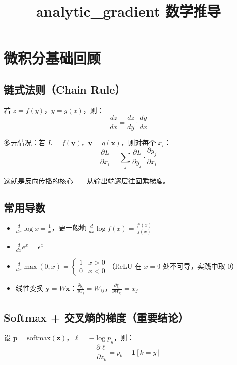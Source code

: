 \documentclass[12pt,a4paper]{article}
\title{analytic\_gradient 数学推导}
\author{}
\date{}
\begin{document}
\maketitle

\section{微积分基础回顾}

\subsection{链式法则（Chain Rule）}

若 $z = f(y)$，$y = g(x)$，则：
\[
\frac{dz}{dx} = \frac{dz}{dy} \cdot \frac{dy}{dx}
\]

多元情况：若 $L = f(\mathbf{y})$，$\mathbf{y} = g(\mathbf{x})$，则对每个 $x_i$：
\[
\frac{\partial L}{\partial x_i} = \sum_j \frac{\partial L}{\partial y_j} \cdot \frac{\partial y_j}{\partial x_i}
\]

这就是反向传播的核心——从输出端逐层往回乘梯度。

\subsection{常用导数}

\begin{itemize}
    \item $\displaystyle \frac{d}{dx} \log x = \frac{1}{x}$，更一般地 $\displaystyle \frac{d}{dx} \log f(x) = \frac{f'(x)}{f(x)}$
    \item $\displaystyle \frac{d}{dx} e^x = e^x$
    \item $\displaystyle \frac{d}{dx} \max(0, x) = \begin{cases} 1 & x > 0 \\ 0 & x < 0 \end{cases}$（ReLU 在 $x=0$ 处不可导，实践中取 0）
    \item 线性变换 $\mathbf{y} = W\mathbf{x}$：$\displaystyle \frac{\partial y_i}{\partial x_j} = W_{ij}$，$\displaystyle \frac{\partial y_i}{\partial W_{ij}} = x_j$
\end{itemize}

\subsection{Softmax + 交叉熵的梯度（重要结论）}

设 $\mathbf{p} = \text{softmax}(\mathbf{z})$，$\ell = -\log p_y$，则：
\[
\frac{\partial \ell}{\partial z_k} = p_k - \mathbf{1}[k = y]
\]
\end{document}
